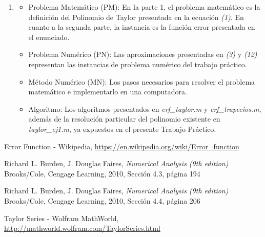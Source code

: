 \documentclass[titlepage,a4paper]{article}
\begin{document}
\begin{enumerate}[label=(\alph*)]
		\item
			\begin{itemize}
				\item Problema Matemático (PM): En la parte 1, el problema matemático es la definición del Polinomio de Taylor presentada en la ecuación \emph{(1)}. En cuanto a la segunda parte, la instancia es la función error presentada en el enunciado.
				\item Problema Numérico (PN): Las aproximaciones presentadas en \emph{(3)} y \emph{(12)} representan las instancias de problema numérico del trabajo práctico.
				\item Método Numérico (MN): Los pasos necesarios para resolver el problema matemático e implementarlo en una computadora.
				\item Algoritmo: Los algoritmos presentados en \textit{erf\_taylor.m} y \textit{erf\_trapecios.m}, además de la resolución particular del polinomio existente en \textit{taylor\_ej1.m}, ya expuestos en el presente Trabajo Práctico.
			\end{itemize}

	\end{enumerate}

\begin{thebibliography}{9} 
		Error Function - Wikipedia, \url{https://en.wikipedia.org/wiki/Error_function}
	
		Richard L. Burden, J. Douglas Faires, \emph{Numerical Analysis (9th edition)} \\
		Brooks/Cole, Cengage Learning, 2010, Sección 4.3, página 194

	Richard L. Burden, J. Douglas Faires, \emph{Numerical Analysis (9th edition)} \\
	Brooks/Cole, Cengage Learning, 2010, Sección 4.4, página 206
	
	Taylor Series - Wolfram MathWorld, \url{http://mathworld.wolfram.com/TaylorSeries.html}
	 
\end{thebibliography}
\end{document}
